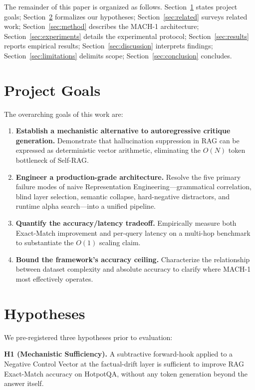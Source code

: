 \documentclass[conference]{IEEEtran}
\begin{document}
The remainder of this paper is organized as follows. Section~\ref{sec:goals} states project goals; Section~\ref{sec:hypotheses} formalizes our hypotheses; Section~\ref{sec:related} surveys related work; Section~\ref{sec:method} describes the MACH-1 architecture; Section~\ref{sec:experiments} details the experimental protocol; Section~\ref{sec:results} reports empirical results; Section~\ref{sec:discussion} interprets findings; Section~\ref{sec:limitations} delimits scope; Section~\ref{sec:conclusion} concludes.

\section{Project Goals}\label{sec:goals}

The overarching goals of this work are:

\begin{enumerate}
    \item \textbf{Establish a mechanistic alternative to autoregressive critique generation.} Demonstrate that hallucination suppression in RAG can be expressed as deterministic vector arithmetic, eliminating the $O(N)$ token bottleneck of Self-RAG.
    \item \textbf{Engineer a production-grade architecture.} Resolve the five primary failure modes of naive Representation Engineering---grammatical correlation, blind layer selection, semantic collapse, hard-negative distractors, and runtime alpha search---into a unified pipeline.
    \item \textbf{Quantify the accuracy/latency tradeoff.} Empirically measure both Exact-Match improvement and per-query latency on a multi-hop benchmark to substantiate the $O(1)$ scaling claim.
    \item \textbf{Bound the framework's accuracy ceiling.} Characterize the relationship between dataset complexity and absolute accuracy to clarify where MACH-1 most effectively operates.
\end{enumerate}

\section{Hypotheses}\label{sec:hypotheses}

We pre-registered three hypotheses prior to evaluation:

\smallskip
\noindent \textbf{H1 (Mechanistic Sufficiency).} A subtractive forward-hook applied to a Negative Control Vector at the factual-drift layer is sufficient to improve RAG Exact-Match accuracy on HotpotQA, without any token generation beyond the answer itself.
\end{document}
